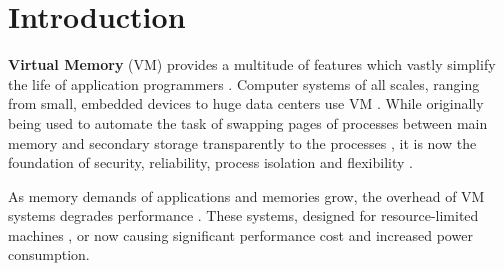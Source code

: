 \chapter{Introduction} %


















\textbf{Virtual Memory} (VM) provides a multitude of features which vastly simplify the life of application programmers \cite{jacob1998virtualissues}. Computer systems of all scales, ranging from small, embedded devices to huge data centers use VM \cite{bhattacharjee2017architectural}.
While originally being used to automate the task of swapping pages of processes between main memory and secondary storage transparently to the processes \cite{jacob1998virtualissues}, it is now the foundation of security, reliability, process isolation and flexibility \cite{wales1999virtual,jacobVirtualMemoryContemporary1998}.

As memory demands of applications and memories grow, the overhead of VM systems degrades performance \cite{zagieboylo2020cost}. These systems, designed for resource-limited machines \cite{halbuer2023morsels}, or now causing significant performance cost and increased power consumption.

